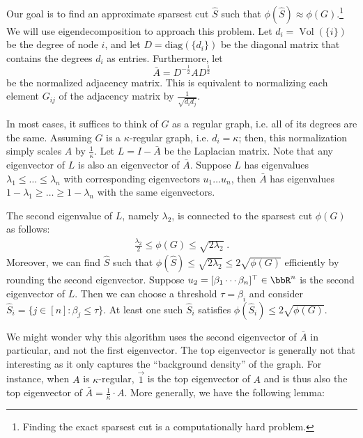 Our goal is to find an approximate sparsest cut $\hat{S}$ such that $\phi(\hat{S}) \approx \phi(G)$.\footnote{Finding the exact sparsest cut is a computationally hard problem.} We will use eigendecomposition to approach this problem. Let $d_i = \operatorname{Vol}(\{i\})$ be the degree of node $i$, and let $D = \text{diag}(\{d_i\})$ be the diagonal matrix that contains the degrees $d_i$ as entries. Furthermore, let 
\begin{equation}
    \bar{A} = D^{-\frac{1}{2}} A D^{\frac{1}{2}}
\end{equation}
be the normalized adjacency matrix. This is equivalent to normalizing each element $G_{ij}$ of the adjacency matrix by $\frac{1}{\sqrt{d_i d_j}}$.

In most cases, it suffices to think of $G$ as a regular graph, i.e. all of its degrees are the same. Assuming $G$ is a $\kappa$-regular graph, i.e. $d_i = \kappa$; then, this normalization simply scales $A$ by $\frac{1}{\kappa}$. Let $L = I - \bar{A}$ be the Laplacian matrix. Note that any eigenvector of $L$ is also an eigenvector of $\bar{A}$. Suppose $L$ has eigenvalues $\lambda_1 \leq \hdots \leq \lambda_n$ with corresponding eigenvectors $u_1 \hdots u_n$, then $\bar{A}$ has eigenvalues $1 - \lambda_1 \geq \hdots \geq 1 - \lambda_n$ with the same eigenvectors.

\begin{theorem}
The second eigenvalue of $L$, namely $\lambda_2$, is connected to the sparsest cut $\phi(G)$ as follows:
\begin{align}
    \frac{\lambda_2}{2} \leq \phi(G) \leq \sqrt{2 \lambda_2} \;.
\end{align}
Moreover, we can find $\hat{S}$ such that $\phi(\hat{S}) \leq \sqrt{2 \lambda_2} \leq 2 \sqrt{\phi(G)}$ efficiently by rounding the second eigenvector. Suppose $u_2 = [\beta_1 \cdots \beta_n]^\top \in \bbR^n$ is the second eigenvector of $L$. Then we can choose a threshold $\tau = \beta_i$ and consider $\hat{S}_i = \{ j \in [n] : \beta_j \leq \tau \}$. At least one such $\hat{S}_i$ satisfies $\phi(\hat{S}_i) \leq 2 \sqrt{\phi(G)}$.
\end{theorem}

We might wonder why this algorithm uses the second eigenvector of $\bar{A}$ in particular, and not the first eigenvector. The top eigenvector is generally not that interesting as it only captures the ``background density'' of the graph. For instance, when $A$ is $\kappa$-regular, $\vec{1}$ is the top eigenvector of $A$ and is thus also the top eigenvector of $\bar{A} = \frac{1}{\kappa} \cdot A$. More generally, we have the following lemma:


